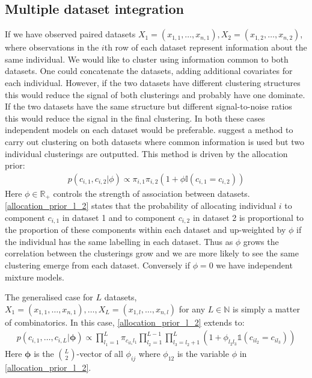 \documentclass[11pt]{article} %
\begin{document}
	\subsection{Multiple dataset integration}
	If we have observed paired datasets $X_1 = (x_{1,1},\ldots,x_{n,1}), X_2 = (x_{1,2},\ldots,x_{n,2})$, where observations in the $i$th row of each dataset represent information about the same individual. We would like to cluster using information common to both datasets. One could concatenate the datasets, adding additional covariates for each individual. However, if the two datasets have different clustering structures this would reduce the signal of both clusterings and probably have one dominate. If the two datasets have the same structure but different signal-to-noise ratios this would reduce the signal in the final clustering. In both these cases independent models on each dataset would be preferable. \citet{kirk_bayesian_2012} suggest a method to carry out clustering on both datasets where common information is used but two individual clusterings are outputted. This method is driven by the allocation prior:
	\begin{align} \label{allocation_prior_l_2}
	p(c_{i,1}, c_{i,2} | \phi ) \propto \pi_{i,1} \pi_{i,2} (1 + \phi \mathbb{I}(c_{i,1} = c_{i,2}))
	\end{align}
	Here $\phi \in \mathbb{R}_+$ controls the strength of association between datasets. \eqref{allocation_prior_l_2} states that the probability of allocating individual $i$ to component $c_{i,1}$ in dataset 1 and to component $c_{i,2}$ in dataset 2 is proportional to the proportion of these components within each dataset and up-weighted by $\phi$ if the individual has the same labelling in each dataset. Thus as $\phi$ grows the correlation between the clusterings grow and we are more likely to see the same clustering emerge from each dataset. Conversely if $\phi = 0$ we have independent mixture models. 
	
	The generalised case for $L$ datasets, $X_1 = (x_{1,1},\ldots,x_{n,1}),\ldots, X_L = (x_{1,l},\ldots,x_{n,l})$ for any $L \in \mathbb{N}$ is simply a matter of combinatorics. In this case, \eqref{allocation_prior_l_2} extends to:
	\begin{align} \label{allocation_prior}
	p(c_{i,1},\ldots,c_{i,L} | \boldsymbol{\phi}) \propto \prod_{l_1=1}^L\pi_{c_{il_1}l_1}\prod_{l_2=1}^{L-1}\prod_{l_3=l_2+1}^L\left(1+\phi_{l_2l_3}\mathbb{1}(c_{il_2} = c_{il_3}) \right)
	\end{align}
	Here $\boldsymbol{\phi}$ is the ${L \choose 2}$-vector of all $\phi_{ij}$ where $\phi_{12}$ is the variable $\phi$ in \eqref{allocation_prior_l_2}.
	
\end{document}
